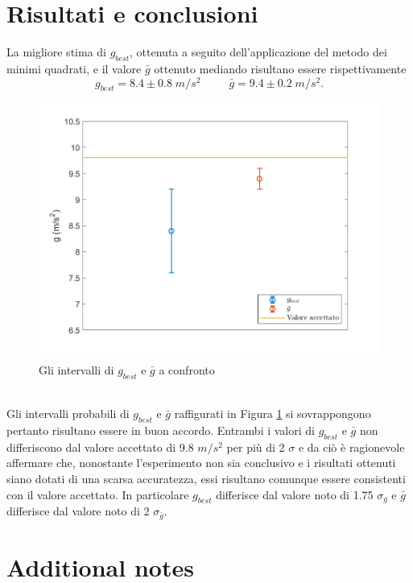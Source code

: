 \documentclass[11pt,a4paper]{article}
\begin{document}
\section{Risultati e conclusioni}
La migliore stima di $g_{best}$, ottenuta a seguito dell'applicazione del metodo dei minimi quadrati, e il valore $\bar{g}$ ottenuto mediando risultano essere rispettivamente
\begin{equation}
    g_{best} = 8.4 \pm 0.8 \; m/s^2 \; \; \; \; \; \; \; \; \; \bar{g} = 9.4 \pm 0.2 \; m/s^2.
    \label{eq:concl}
\end{equation}
\begin{figure}[H]
    \centering
    \includegraphics[scale=0.7]{img/gplot2.png}
    \caption{Gli intervalli di $g_{best}$ e $\bar{g}$ a confronto}
    \label{fig:gconcl}
\end{figure}
\\
Gli intervalli probabili di $g_{best}$ e $\bar{g}$ raffigurati in Figura \ref{fig:gconcl} si sovrappongono pertanto risultano essere in buon accordo. Entrambi i valori di $g_{best}$ e $\bar{g}$ non differiscono dal valore accettato di 9.8 $m/s^2$ per più di 2 $\sigma$ e da ciò è ragionevole affermare che, nonostante l'esperimento non sia conclusivo e i risultati ottenuti siano dotati di una scarsa accuratezza, essi risultano comunque essere consistenti con il valore accettato. In particolare $g_{best}$ differisce dal valore noto di 1.75 $\sigma_g$ e $\bar{g}$ differisce dal valore noto di 2 $\sigma_\bar{g}$.

\section{Additional notes}
\end{document}
